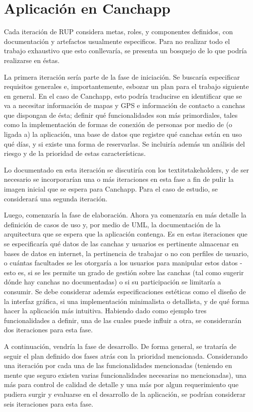 \documentclass[spanish]{udpreport}
\begin{document}
\chapter{Aplicación en Canchapp}
Cada iteración de RUP considera metas, roles, y componentes definidos, con documentación y artefactos usualmente especificos. Para no realizar todo el trabajo exhaustivo que esto conllevaría, se presenta un bosquejo de lo que podría realizarse en éstas.\par
La primera iteración sería parte de la fase de iniciación. Se buscaría especificar requisitos generales e, importantemente, esbozar un plan para el trabajo siguiente en general. En el caso de Canchapp, esto podría traducirse en identificar que se va a necesitar información de mapas y GPS e información de contacto a canchas que dispongan de ésta; definir qué funcionalidades son más primordiales, tales como la implementación de formas de conexión de personas por medio de (o ligada a) la aplicación, una base de datos que registre qué canchas están en uso qué días, y si existe una forma de reservarlas. Se incluiría además un análisis del riesgo y de la prioridad de estas características.\par
Lo documentado en esta iteración se discutiría con los textit{stakeholders}, y de ser necesario se incorporarían una o más iteraciones en esta fase a fin de pulir la imagen inicial que se espera para Canchapp. Para el caso de estudio, se considerará una segunda iteración.\par
Luego, comenzaría la fase de elaboración. Ahora ya comenzaría en más detalle la definición de casos de uso y, por medio de UML, la documentación de la arquitectura que se espera que la aplicación contenga. Es en estas iteraciones que se especificaría qué datos de las canchas y usuarios es pertinente almacenar en bases de datos en internet, la pertinencia de trabajar o no con perfiles de usuario, o cuántas facultades se les otorgaría a los usuarios para manipular estos datos -esto es, si se les permite un grado de gestión sobre las canchas (tal como sugerir dónde hay canchas no documentadas) o si su participación se limitaría a consumir. Se debe considerar además especificaciones estéticas como el diseño de la interfaz gráfica, si una implementación minimalista o detallista, y de qué forma hacer la aplicación más intuitiva. Habiendo dado como ejemplo tres funcionalidades a definir, una de las cuales puede influir a otra, se considerarán dos iteraciones para esta fase.\par
A continuación, vendría la fase de desarrollo. De forma general, se trataría de seguir el plan definido dos fases atrás con la prioridad mencionada. Considerando una iteración por cada una de las funcionalidades mencionadas (teniendo en mente que seguro existen varias funcionalidades necesarias no mencionadas), una más para control de calidad de detalle y una más por algun requerimiento que pudiera surgir y evaluarse en el desarrollo de la aplicación, se podrían considerar seis iteraciones para esta fase.\par
\end{document}
